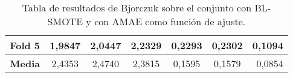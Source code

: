 \begin{table}[H]
{\begin{tabular}{|crrrrrr|}
\multicolumn{1}{|c|}{\textbf{Fold 5}}            & \multicolumn{1}{c|}{1,9847}            & \multicolumn{1}{c|}{2,0447}              & \multicolumn{1}{c|}{2,2329}          & \multicolumn{1}{c|}{0,2293}            & \multicolumn{1}{c|}{0,2302}              & \textbf{0,1094} \\ \hline
\multicolumn{1}{|c|}{\textbf{Media}}             & \multicolumn{1}{c|}{2,4353}           & \multicolumn{1}{c|}{2,4740}             & \multicolumn{1}{c|}{2,3815}          & \multicolumn{1}{c|}{0,1595}           & \multicolumn{1}{c|}{0,1579}              & 0,0854         \\ \hline
\end{tabular}%
}
\caption{Tabla de resultados de Bjorczuk sobre el conjunto con BL-SMOTE y con AMAE como función de ajuste.}\label{tablaBJORCZUKconBLSMOTEconAMAE}

\end{table}


